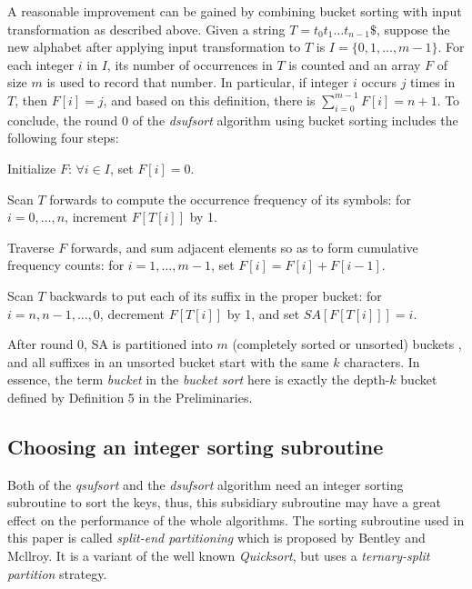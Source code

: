 \documentclass{ws-ijprai}
\begin{document}
A reasonable improvement can be gained by combining bucket sorting
with input transformation as described above. Given a string $T =
t_0t_1 \dots t_{n-1}\$$, suppose the new alphabet after applying input
transformation to $T$ is $I = \{0,1,\dots,m-1\}$. For each integer $i$ in
$I$, its number of occurrences in $T$ is counted and an array $F$ of size $m$ is
used to record that number. In particular, if integer $i$ occurs
$j$ times in $T$, then $F[i] = j$, and based on this definition, there
is $\sum_{i=0}^{m-1} F[i] = n + 1$. To conclude, the round 0 of the
\emph{dsufsort} algorithm using bucket sorting includes the following four steps:

\begin{arabiclist}
\item Initialize $F$: $\forall i \in I$, set $F[i] = 0$.
\item Scan $T$ forwards to compute the occurrence frequency of
its symbols: for $i = 0,\dots,n$, increment $F[T[i]]$ by 1.
\item Traverse $F$ forwards, and sum adjacent elements so as
to form cumulative frequency counts: for $i = 1, \dots, m-1$, set
$F[i] = F[i] + F[i-1]$.
\item Scan $T$ backwards to put each of its suffix in the proper
bucket: for $i = n, n-1,\dots, 0$, decrement $F[T[i]]$ by 1, and set
$SA[F[T[i]]] = i$.
\end{arabiclist}

After round 0, SA is partitioned into $m$ (completely sorted or
unsorted) buckets , and all suffixes in an unsorted bucket start with
the same $k$ characters. In essence, the term \emph{bucket} in the
\emph{bucket sort} here is exactly the depth-$k$ bucket defined by
Definition 5 in the Preliminaries.

\subsection{Choosing an integer sorting subroutine}

Both of the \emph{qsufsort} and the \emph{dsufsort} algorithm need an
integer sorting subroutine to sort the keys, thus, this subsidiary
subroutine may have a great effect on the performance of the whole
algorithms. The sorting subroutine used in this paper is called
\emph{split-end partitioning} which is proposed by Bentley and
Mcllroy\cite{t_quciksort}. It is a variant of the well known
\emph{Quicksort}\cite{quicksort}, but uses a \emph{ternary-split
partition} strategy.
\end{document}
